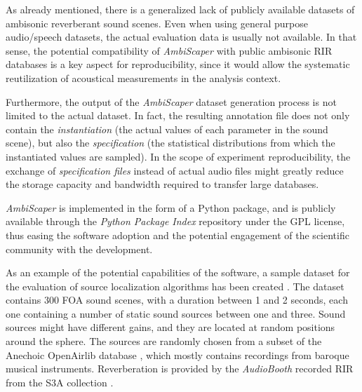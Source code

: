 As already mentioned, there is a generalized lack of publicly available datasets of ambisonic reverberant sound scenes. 
Even when using general purpose audio/speech datasets, the actual evaluation data is usually not available.
In that sense, the potential compatibility of \textit{AmbiScaper} with public ambisonic RIR databases is a key aspect for reproducibility, since it would allow the systematic reutilization of acoustical measurements in the analysis context.

Furthermore, the output of the \textit{AmbiScaper} dataset generation process is not limited to the actual dataset. 
In fact, the resulting annotation file does not only contain the \textit{instantiation} (the actual values of each parameter in the sound scene), but also the \textit{specification} (the statistical distributions from which the instantiated values are sampled). 
In the scope of experiment reproducibility, the exchange of \textit{specification files} instead of actual audio files might greatly reduce the storage capacity and bandwidth required to transfer large databases. 

\textit{AmbiScaper} is implemented in the form of a Python package, and is publicly available through the \textit{Python Package Index} repository  under the GPL license, thus easing the software adoption and the potential engagement of the scientific community with the development. 

As an example of the potential capabilities of the software, a sample dataset for the evaluation of source localization algorithms has been created \cite{ambiscaperDataset}.
The dataset contains 300 FOA sound scenes, with a duration between 1 and 2 seconds, each one containing a number of static sound sources between one and three.
Sound sources might have different gains, and they are located at random positions around the sphere. 
The sources are randomly chosen from a subset of the Anechoic OpenAirlib database \cite{openair}, which mostly contains recordings from baroque musical instruments.
Reverberation is provided by the \textit{AudioBooth} recorded RIR from the S3A collection \cite{coleman2015s3a}.\\





%
%
%
%
%
%
%
%
%
%
%
